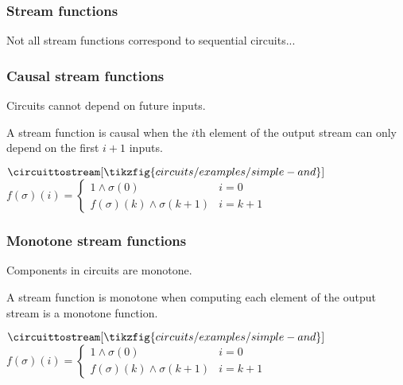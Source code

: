 \begin{frame}
    \frametitle{Stream functions}

    Not all stream functions correspond to sequential circuits...
    
\end{frame}

\begin{frame}
    \frametitle{Causal stream functions}

    Circuits cannot depend on \alert{future inputs}.

    \wait

    A stream function is \alert{causal} when the \(i\)th element of the output stream can only depend on the first \(i+1\) inputs.

    \wait

    \begin{center}
        \(
            \circuittostream[\tikzfig{circuits/examples/simple-and}]{}
        \)
        \qquad
        \(
            f(\sigma)(i) =
            \begin{cases}
                1 \land \sigma(0) & i = 0 \\
                f(\sigma)(k) \land \sigma(k+1) & i = k+1
                
            \end{cases}
        \)
    \end{center}
\end{frame}


\begin{frame}
    \frametitle{Monotone stream functions}

    Components in circuits are \alert{monotone}.

    A stream function is \alert{monotone} when computing each element of the output stream is a monotone function.

    \begin{center}
        \(
            \circuittostream[\tikzfig{circuits/examples/simple-and}]{}
        \)
        \qquad
        \(
            f(\sigma)(i) =
            \begin{cases}
                1 \land \sigma(0) & i = 0 \\
                f(\sigma)(k) \land \sigma(k+1) & i = k+1
                
            \end{cases}
        \)
    \end{center}

\end{frame}

